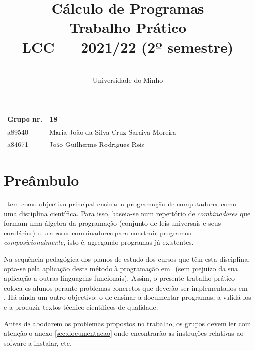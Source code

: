 \documentclass[a4paper]{article}
\title{
          Cálculo de Programas
\\
          Trabalho Prático
\\
          LCC --- 2021/22 (2º semestre)
}
\author{
          \dium
\\
          Universidade do Minho
}
\date\mydate
\begin{document}
\maketitle

\begin{center}\large
\begin{tabular}{ll}
\textbf{Grupo} nr. & 18 
\\\hline
a89540 & Maria João da Silva Cruz Saraiva Moreira
\\
a84671 & João Guilherme Rodrigues Reis 
\end{tabular}
\end{center}

\section{Preâmbulo}

\CP\ tem como objectivo principal ensinar
a progra\-mação de computadores como uma disciplina científica. Para isso,
baseia-se num repertório de \emph{combinadores} que formam uma álgebra da
programação (conjunto de leis universais e seus corolários) e usa esses
combinadores para construir programas \emph{composicionalmente}, isto é,
agregando programas já existentes.

Na sequência pedagógica dos planos de estudo dos cursos que têm
esta disciplina, opta-se pela aplicação deste método à programação
em \Haskell\ (sem prejuízo da sua aplicação a outras linguagens
funcionais). Assim, o presente trabalho prático coloca os
alunos perante problemas concretos que deverão ser implementados em
\Haskell.  Há ainda um outro objectivo: o de ensinar a documentar
programas, a validá-los e a produzir textos técnico-científicos de
qualidade.

Antes de abodarem os problemas propostos no trabalho, os grupos devem ler
com atenção o anexo \ref{sec:documentacao} onde encontrarão as instruções
relativas ao sofware a instalar, etc.


\Problema
\end{document}
